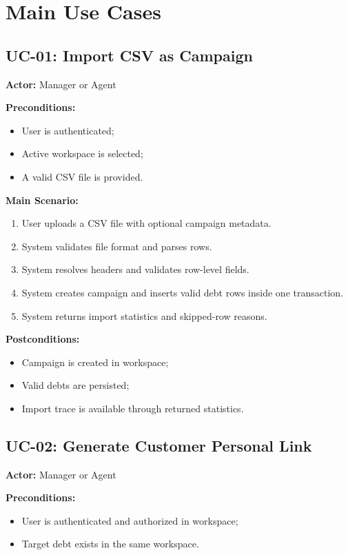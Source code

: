 \section{Main Use Cases}
\subsection{UC-01: Import CSV as Campaign}
\textbf{Actor:} Manager or Agent

\textbf{Preconditions:}
\begin{itemize}
  \item User is authenticated;
  \item Active workspace is selected;
  \item A valid CSV file is provided.
\end{itemize}

\textbf{Main Scenario:}
\begin{enumerate}
  \item User uploads a CSV file with optional campaign metadata.
  \item System validates file format and parses rows.
  \item System resolves headers and validates row-level fields.
  \item System creates campaign and inserts valid debt rows inside one transaction.
  \item System returns import statistics and skipped-row reasons.
\end{enumerate}

\textbf{Postconditions:}
\begin{itemize}
  \item Campaign is created in workspace;
  \item Valid debts are persisted;
  \item Import trace is available through returned statistics.
\end{itemize}

\subsection{UC-02: Generate Customer Personal Link}
\textbf{Actor:} Manager or Agent

\textbf{Preconditions:}
\begin{itemize}
  \item User is authenticated and authorized in workspace;
  \item Target debt exists in the same workspace.
\end{itemize}

